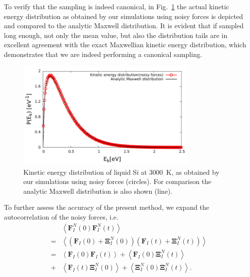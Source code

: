 \documentclass[preprint]{elsarticle}
\begin{document}
To verify that the sampling is indeed canonical, in Fig.~\ref{Fig3} the actual kinetic energy distribution as obtained by our simulations using noisy forces is depicted and compared to the analytic Maxwell distribution. It is evident that if sampled long enough, not only the mean value, but also the distribution tails are in excellent agreement with the exact Maxwellian kinetic energy distribution, which demonstrates that we are indeed performing a canonical sampling.
\begin{figure}
\begin{center}
\includegraphics[width=0.8\textwidth]
{maxwelldistribution_new.pdf}
\end{center}
\caption{\label{Fig3}
Kinetic energy distribution of liquid Si at 3000~K, as obtained by our simulations using noisy forces (circles). For comparison the analytic Maxwell distribution is also shown (line).
} \end{figure}
To further assess the accuracy of the present method, we expand the autocorrelation of the noisy forces, i.e.
\begin{subequations}
\begin{eqnarray}
  && \left \langle \textbf{F}_{I}^{N}\left ( 0 \right )\textbf{F}_{I}^{N}\left ( t \right )\right \rangle \\
  &=& \left \langle \left ( \textbf{F}_{I}\left ( 0 \right ) + \mathbf{\Xi } _{I}^{N} \left(0 \right )\right) \left( \textbf{F}_{I}\left ( t \right )+\mathbf{\Xi } _{I}^{N}\left ( t \right )\right) \right \rangle \\
  &=& \left \langle \textbf{F}_{I}\left ( 0 \right ) \textbf{F}_{I}\left ( t \right )\right \rangle + \left \langle \textbf{F}_{I}\left ( 0 \right ) \mathbf{\Xi } _{I}^{N}\left(t \right )\right \rangle \label{AutoCorr} \\
  &+& \left \langle \textbf{F}_{I}\left ( t \right ) \mathbf{\Xi } _{I}^{N}\left(0 \right )\right \rangle + \left \langle \mathbf{\Xi } _{I}^{N}\left(0 \right ) \mathbf{\Xi } _{I}^{N}\left(t \right )\right \rangle.  \nonumber
\end{eqnarray}
\end{subequations}
\end{document}
